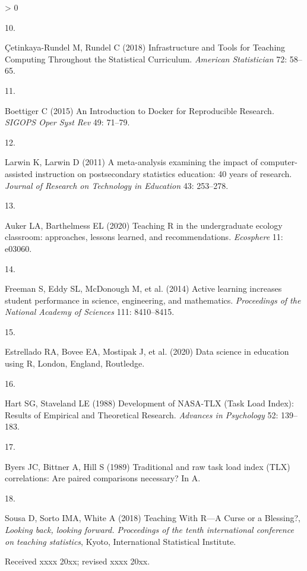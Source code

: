 \documentclass{aims}
\theoremstyle{definition}
\newlength{\cslhangindent}
\newlength{\csllabelwidth}
\newenvironment{CSLReferences}[3] %
   {%
    \setlength{\parindent}{0pt}
    \ifodd #1 \everypar{\setlength{\hangindent}{\cslhangindent}}\ignorespaces\fi
    \ifnum #2 > 0
    \setlength{\parskip}{#2\baselineskip}
    \fi
   }%
   {}
\newcommand{\CSLLeftMargin}[1]{\parbox[t]{\maxof{\widthof{#1}}{\csllabelwidth}}{#1}}
\newcommand{\CSLRightInline}[1]{\parbox[t]{\linewidth}{#1}}
\begin{document}
\begin{CSLReferences}{0}{0}
\leavevmode\hypertarget{ref-Cetinkaya-Rundel2018}{}%
\CSLLeftMargin{10. }
\CSLRightInline{Çetinkaya-Rundel M, Rundel C (2018) {Infrastructure and
Tools for Teaching Computing Throughout the Statistical Curriculum}.
\emph{American Statistician} 72: 58--65.}

\leavevmode\hypertarget{ref-Boettiger2015}{}%
\CSLLeftMargin{11. }
\CSLRightInline{Boettiger C (2015) {An Introduction to Docker for
Reproducible Research}. \emph{SIGOPS Oper Syst Rev} 49: 71--79.}

\leavevmode\hypertarget{ref-Larwin2011}{}%
\CSLLeftMargin{12. }
\CSLRightInline{Larwin K, Larwin D (2011) {A meta-analysis examining the
impact of computer-assisted instruction on postsecondary statistics
education: 40 years of research}. \emph{Journal of Research on
Technology in Education} 43: 253--278.}

\leavevmode\hypertarget{ref-Auker2020}{}%
\CSLLeftMargin{13. }
\CSLRightInline{Auker LA, Barthelmess EL (2020) {Teaching R in the
undergraduate ecology classroom: approaches, lessons learned, and
recommendations}. \emph{Ecosphere} 11: e03060.}

\leavevmode\hypertarget{ref-Freeman2014}{}%
\CSLLeftMargin{14. }
\CSLRightInline{Freeman S, Eddy SL, McDonough M, et al. (2014) {Active
learning increases student performance in science, engineering, and
mathematics}. \emph{Proceedings of the National Academy of Sciences}
111: 8410--8415.}

\leavevmode\hypertarget{ref-Estrellado2020}{}%
\CSLLeftMargin{15. }
\CSLRightInline{Estrellado RA, Bovee EA, Mostipak J, et al. (2020) {Data
science in education using R}, London, England, Routledge.}

\leavevmode\hypertarget{ref-Hart1988}{}%
\CSLLeftMargin{16. }
\CSLRightInline{Hart SG, Staveland LE (1988) {Development of NASA-TLX
(Task Load Index): Results of Empirical and Theoretical Research}.
\emph{Advances in Psychology} 52: 139--183.}

\leavevmode\hypertarget{ref-Byers1989}{}%
\CSLLeftMargin{17. }
\CSLRightInline{Byers JC, Bittner A, Hill S (1989) {Traditional and raw
task load index (TLX) correlations: Are paired comparisons necessary? In
A}.}

\leavevmode\hypertarget{ref-Sousa2018}{}%
\CSLLeftMargin{18. }
\CSLRightInline{Sousa D, Sorto IMA, White A (2018) {Teaching With R---A
Curse or a Blessing?}, \emph{Looking back, looking forward. Proceedings
of the tenth international conference on teaching statistics}, Kyoto,
International Statistical Institute.}

\end{CSLReferences}




\medskip
Received xxxx 20xx; revised xxxx 20xx.
\medskip
\end{document}
